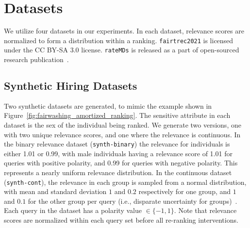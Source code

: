 \section{Datasets}
\label{sec:datasets}
We utilize four datasets in our experiments. In each dataset, relevance scores are normalized to form a distribution within a ranking. \texttt{fairtrec2021} is licensed under the CC BY-SA 3.0 license. \texttt{rateMDs} is released as a part of open-sourced research publication~\cite{thawani2019online}.

\subsection{Synthetic Hiring Datasets}
Two synthetic datasets are generated, to mimic the example shown in Figure~\ref{fig:fairwashing_amortized_ranking}. The sensitive attribute in each dataset is the sex of the individual being ranked. We generate two versions, one with two unique relevance scores, and one where the relevance is continuous. In the binary relevance dataset (\texttt{synth-binary}) the relevance for individuals is either 1.01 or 0.99, with male individuals having a relevance score of 1.01 for queries with positive polarity, and 0.99 for queries with negative polarity. This represents a nearly uniform relevance distribution. In the continuous dataset (\texttt{synth-cont}), the relevance in each group is sampled from a normal distribution, with mean and standard deviation $1$ and $0.2$ respectively for one group, and $1$ and $0.1$ for the other group per query (i.e., disparate uncertainty for groups)~\cite{rastogi2024fairness}. Each query in the dataset has a polarity value $\in \{-1,1\}$. Note that relevance scores are normalized within each query set before all re-ranking interventions.

